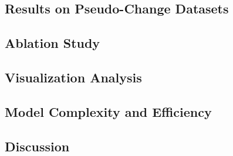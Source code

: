     \subsection{Results on Pseudo-Change Datasets}\label{subsec:Results on Pseudo-Change Datasets}%


    \subsection{Ablation Study}\label{subsec:Ablation Study}%


    \subsection{Visualization Analysis}\label{subsec:Visualization Analysis}%


    \subsection{Model Complexity and Efficiency}\label{subsec:Model Complexity and Efficiency}%


    \subsection{Discussion}\label{subsec:Discussion}%
        

